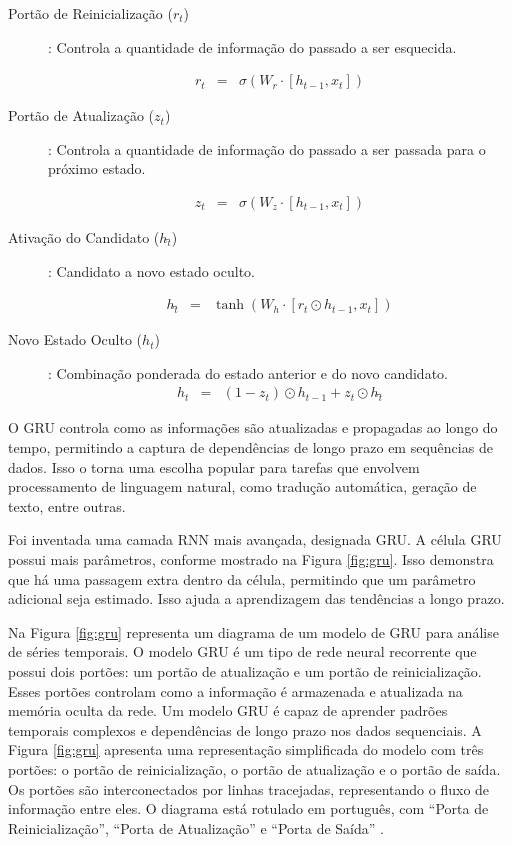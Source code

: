\begin{description}
	\item[Portão de Reinicialização (\(r_t\))]: Controla a quantidade de informação do passado a ser esquecida.
	
 \begin{eqnarray}
 	r_t &=& \sigma(W_r \cdot [h_{t-1}, x_t])\label{eq:gru}
 \end{eqnarray} 

\item[Portão de Atualização (\(z_t\))]: Controla a quantidade de informação do passado a ser passada para o próximo estado.

 \begin{eqnarray}
 	z_t &=& \sigma(W_z \cdot [h_{t-1}, x_t])\label{eq:gru1}
 \end{eqnarray}

\item[Ativação do Candidato (\(h\widetilde{_t}\))]: Candidato a novo estado oculto.

\begin{eqnarray}
	h\widetilde{_t} &=& \tanh\left(W_h \cdot [r_t \odot h_{t-1}, x_t]\right)\label{eq:gru2}
\end{eqnarray}

\item[Novo Estado Oculto (\(h_t\))]: Combinação ponderada do estado anterior e do novo candidato.
\begin{eqnarray}
	h_t &=& (1 - z_t) \odot h_{t-1} + z_t \odot h\widetilde{_t}\label{eq:gru3}
\end{eqnarray}
\end{description}



O GRU controla como as informações são atualizadas e propagadas ao longo do tempo, permitindo a captura de dependências de longo prazo em sequências de dados. Isso o torna uma escolha popular para tarefas que envolvem processamento de linguagem natural, como tradução automática, geração de texto, entre outras.


Foi inventada uma camada RNN mais avançada, designada GRU. A célula GRU possui mais parâmetros, conforme mostrado na Figura \ref{fig:gru}. Isso demonstra que há uma passagem extra dentro da célula, permitindo que um parâmetro adicional seja estimado. Isso ajuda a aprendizagem das tendências a longo prazo.

Na Figura \ref{fig:gru} representa um diagrama de um modelo de GRU para análise de séries temporais. O modelo GRU é um tipo de rede neural recorrente que possui dois portões: um portão de atualização e um portão de reinicialização. Esses portões controlam como a informação é armazenada e atualizada na memória oculta da rede. Um modelo GRU é capaz de aprender padrões temporais complexos e dependências de longo prazo nos dados sequenciais. A Figura \ref{fig:gru} apresenta uma representação simplificada do modelo com três portões: o portão de reinicialização, o portão de atualização e o portão de saída. Os portões são interconectados por linhas tracejadas, representando o fluxo de informação entre eles. O diagrama está rotulado em português, com ``Porta de Reinicialização'', ``Porta de Atualização'' e ``Porta de Saída'' \cite{Saranya2020, Jordan2021, Khan2022}.


